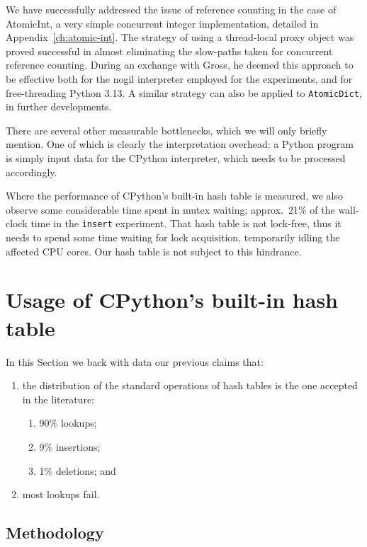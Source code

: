 We have successfully addressed the issue of reference counting in the case of AtomicInt, a very simple concurrent integer implementation, detailed in Appendix~\ref{ch:atomic-int}.
The strategy of using a thread-local proxy object was proved successful in almost eliminating the slow-paths taken for concurrent reference counting.
During an exchange with Gross, he deemed this approach to be effective both for the nogil interpreter employed for the experiments, and for free-threading Python 3.13.
A similar strategy can also be applied to \texttt{AtomicDict}, in further developments.

There are several other measurable bottlenecks, which we will only briefly mention.
One of which is clearly the interpretation overhead: a Python program is simply input data for the CPython interpreter, which needs to be processed accordingly.

Where the performance of CPython's built-in hash table is measured, we also observe some considerable time spent in mutex waiting; approx.\ 21\% of the wall-clock time in the \texttt{insert} experiment.
That hash table is not lock-free, thus it needs to spend some time waiting for lock acquisition, temporarily idling the affected CPU cores.
Our hash table is not subject to this hindrance.


\section{Usage of CPython's built-in hash table}\label{sec:dict-metrics}

In this Section we back with data our previous claims that:
\begin{enumerate}
    \item the distribution of the standard operations of hash tables is the one accepted in the literature:
    \begin{enumerate}
        \item 90\% lookups;
        \item 9\% insertions;
        \item 1\% deletions; and
    \end{enumerate}
    \item most lookups fail.
\end{enumerate}

\subsection{Methodology}\label{subsec:dict-metrics-methodology}

